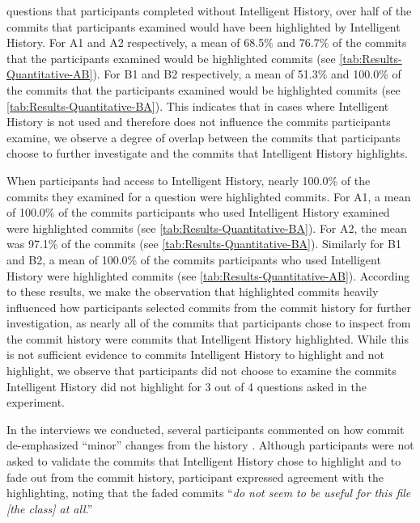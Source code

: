  questions that participants completed without Intelligent History,
over half of the commits that participants examined would have been highlighted by Intelligent History.
For A1 and A2 respectively, a mean of 68.5\% and 76.7\% 
of the commits that the participants examined would be highlighted commits (see \autoref{tab:Results-Quantitative-AB}).
For B1 and B2 respectively, a mean of 51.3\% and 100.0\% 
of the commits that the participants examined would be highlighted commits (see \autoref{tab:Results-Quantitative-BA}).
This indicates that in cases where Intelligent History is not used and therefore does not influence the commits  participants examine,
we observe a degree of overlap between the commits that participants choose to further investigate and the commits that Intelligent History highlights.

When participants had access to Intelligent History,
nearly 100.0\% of the commits they examined for a question were highlighted commits.
For A1, a mean of 100.0\% of the commits  participants who used Intelligent History examined 
were highlighted commits (see \autoref{tab:Results-Quantitative-BA}).
For A2, the mean was 97.1\% of the commits (see \autoref{tab:Results-Quantitative-BA}).
Similarly for B1 and B2, a mean of 100.0\% of the commits  participants who used Intelligent History 
were highlighted commits (see \autoref{tab:Results-Quantitative-AB}).
According to these results, we make the observation that highlighted commits heavily 
influenced how participants selected commits from the commit history for further investigation, as
nearly all of the commits that participants chose to inspect from the commit history were commits that Intelligent History highlighted.
While this is not sufficient evidence to  commits  Intelligent History
 to highlight and not highlight, we observe that participants did not choose to examine the 
commits Intelligent History did not highlight for 3 out of 4 questions asked in the experiment.

In the interviews we conducted, 
several participants commented on how commit  de-emphasized ``minor'' changes from the history .
Although participants were not asked to validate the commits that Intelligent History chose to highlight and to fade out from the commit history, 
participant  expressed agreement with the highlighting, 
noting that the faded commits ``\textit{do not seem to be useful for this file [the  class] at all}.''

